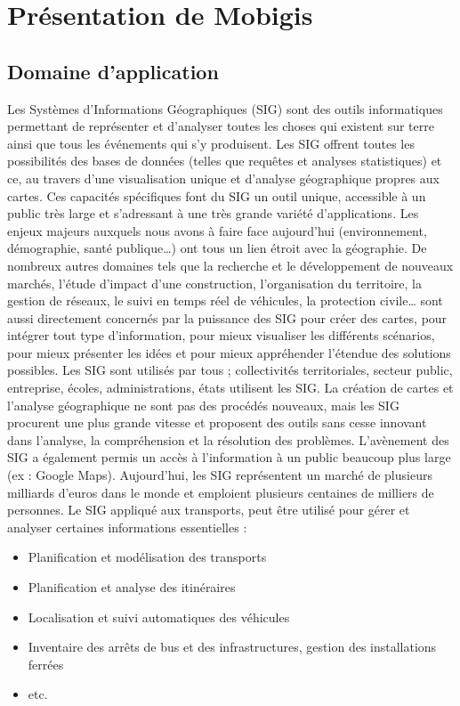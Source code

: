 \chapter{Présentation de Mobigis}
\label{PresentationEntreprise}

\section{Domaine d'application}\label{sig}

Les Systèmes d'Informations Géographiques (SIG) sont des outils informatiques permettant de représenter et d'analyser toutes les choses qui existent sur terre ainsi que tous les événements qui s'y produisent.
Les SIG offrent toutes les possibilités des bases de données (telles que requêtes et analyses statistiques) et ce, au travers d'une visualisation unique et d'analyse géographique propres aux cartes. Ces capacités spécifiques font du SIG un outil unique, accessible à un public très large et s'adressant à une très grande variété d'applications. 
Les enjeux majeurs auxquels nous avons à faire face aujourd'hui (environnement, démographie, santé publique…) ont tous un lien étroit avec la géographie. De nombreux autres domaines tels que la recherche et le développement de nouveaux marchés, l'étude d'impact d'une construction, l'organisation du territoire, la gestion de réseaux, le suivi en temps réel de véhicules, la protection civile… sont aussi directement concernés par la puissance des SIG pour créer des cartes, pour intégrer tout type d'information, pour mieux visualiser les différents scénarios, pour mieux présenter les idées et pour mieux appréhender l'étendue des solutions possibles.
Les SIG sont utilisés par tous ; collectivités territoriales, secteur public, entreprise, écoles, administrations, états utilisent les SIG. La création de cartes et l'analyse géographique ne sont pas des procédés nouveaux, mais les SIG procurent une plus grande vitesse et proposent des outils sans cesse innovant dans l'analyse, la compréhension et la résolution des problèmes.
L'avènement des SIG a également permis un accès à l'information à un public beaucoup plus large (ex : Google Maps). Aujourd'hui, les SIG représentent un marché de plusieurs milliards d'euros dans le monde et emploient plusieurs centaines de milliers de personnes. 
Le SIG appliqué aux transports, peut être utilisé pour gérer et analyser certaines informations essentielles :
\begin{itemize}
\item Planification et modélisation des transports
\item Planification et analyse des itinéraires 
\item Localisation et suivi automatiques des véhicules 
\item Inventaire des arrêts de bus et des infrastructures, gestion des installations ferrées 
\item etc. 
\end{itemize}


